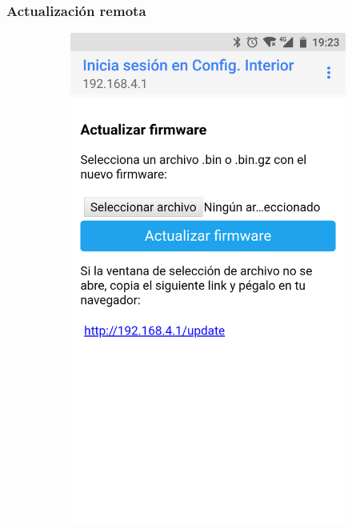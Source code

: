 \subsubsection{Actualización remota}
\label{sec:actualizar}

\begin{figure}
\begin{subfigure}{0.49\columnwidth}
  \centering
  \includegraphics[width=1\columnwidth,frame]{images/interior-firmware-update}
  \caption{}
  \label{fig:interior-firmware-update}

\end{subfigure}
\end{figure}
